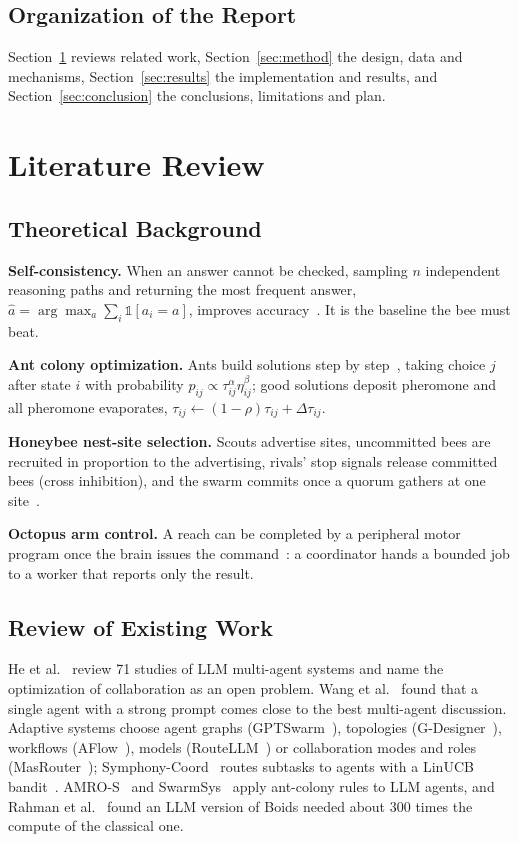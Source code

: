 \documentclass[12pt,a4paper]{article}
\newcommand{\runin}[1]{\textbf{#1}\quad}
\begin{document}
\subsection{Organization of the Report}
Section~\ref{sec:lit} reviews related work, Section~\ref{sec:method} the design, data and mechanisms,
Section~\ref{sec:results} the implementation and results, and Section~\ref{sec:conclusion} the
conclusions, limitations and plan.

\section{Literature Review}
\label{sec:lit}

\subsection{Theoretical Background}
\runin{Self-consistency.} When an answer cannot be checked, sampling $n$ independent reasoning paths and
returning the most frequent answer, $\hat{a}=\arg\max_a \sum_i \mathbb{1}[a_i=a]$, improves
accuracy~\cite{wang2023selfconsistency}. It is the baseline the bee must beat.

\runin{Ant colony optimization.} Ants build solutions step by step~\cite{dorigo2004aco}, taking choice
$j$ after state $i$ with probability $p_{ij}\propto\tau_{ij}^{\alpha}\eta_{ij}^{\beta}$; good solutions
deposit pheromone and all pheromone evaporates, $\tau_{ij}\leftarrow(1-\rho)\tau_{ij}+\Delta\tau_{ij}$.

\runin{Honeybee nest-site selection.} Scouts advertise sites, uncommitted bees are recruited in
proportion to the advertising, rivals' stop signals release committed bees (cross inhibition), and the
swarm commits once a quorum gathers at one site~\cite{seeley2012}.

\runin{Octopus arm control.} A reach can be completed by a peripheral motor program once the brain
issues the command~\cite{sumbre2001}: a coordinator hands a bounded job to a worker that reports only the
result.

\subsection{Review of Existing Work}
He et al.~\cite{he2025lma} review 71 studies of LLM multi-agent systems and name the optimization of
collaboration as an open problem. Wang et al.~\cite{wang2024rethinking} found that a single agent with a
strong prompt comes close to the best multi-agent discussion. Adaptive systems choose agent graphs
(GPTSwarm~\cite{zhuge2024gptswarm}), topologies (G-Designer~\cite{zhang2025gdesigner}), workflows
(AFlow~\cite{zhang2025aflow}), models (RouteLLM~\cite{ong2025routellm}) or collaboration modes and roles
(MasRouter~\cite{yue2025masrouter}); Symphony-Coord~\cite{guan2026symphony} routes subtasks to agents with
a LinUCB bandit~\cite{li2010linucb}. AMRO-S~\cite{wang2026amros} and SwarmSys~\cite{li2025swarmsys} apply
ant-colony rules to LLM agents, and Rahman et al.~\cite{rahman2026swarms} found an LLM version of Boids
needed about 300 times the compute of the classical one.
\end{document}
